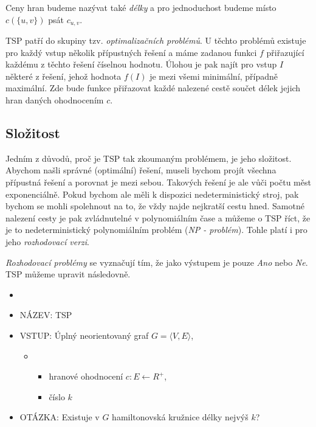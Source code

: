 \documentclass[
  biblatex,
  figures=false,
  glossaries,
  index
]{kidiplom}
\begin{document}
Ceny hran budeme nazývat také \textit{délky} a pro jednoduchost budeme místo $c(\{u, v\})$ psát $c_{u, v}$.

TSP patří do skupiny tzv. \textit{optimalizačních problémů}. U těchto problémů existuje pro každý vstup několik přípustných řešení a máme zadanou funkci $f$ přiřazující každému z těchto řešení číselnou hodnotu. Úlohou je pak najít pro vstup $I$ některé z řešení, jehož hodnota $f(I)$ je mezi všemi minimální, případně maximální. Zde bude funkce přiřazovat každé nalezené cestě součet délek jejich hran daných ohodnocením $c$.

\subsection{Složitost}
Jedním z důvodů, proč je TSP tak zkoumaným problémem, je jeho složitost. Abychom našli správné (optimální) řešení, museli bychom projít všechna přípustná řešení a porovnat je mezi sebou. Takových řešení je ale vůči počtu měst exponenciálně. Pokud bychom ale měli k dispozici nedeterministický stroj, pak bychom se mohli spolehnout na to, že vždy najde nejkratší cestu hned. Samotné nalezení cesty je pak zvládnutelné v polynomiálním čase a můžeme o TSP říct, že je to nedeterministický polynomiálním problém (\textit{NP - problém}). Tohle platí i pro jeho \textit{rozhodovací verzi}.

\textit{Rozhodovací problémy} se vyznačují tím, že jako výstupem je pouze \textit{Ano} nebo \textit{Ne}. TSP můžeme upravit následovně.
\begin{definition}
\begin{itemize}[label={}]
  \item
  \item NÁZEV: TSP
  \item VSTUP: Úplný neorientovaný graf $G=\langle V, E \rangle$,
  \begin{itemize}[label={}]
  \item \begin{itemize}[label={}]
  \item hranové ohodnocení $c : E \leftarrow R^+$,
  \item číslo $k$
  \end{itemize}
  \end{itemize}
  \item OTÁZKA: Existuje v $G$ hamiltonovská kružnice délky nejvýš $k$?
\end{itemize}
\end{definition}
\end{document}
